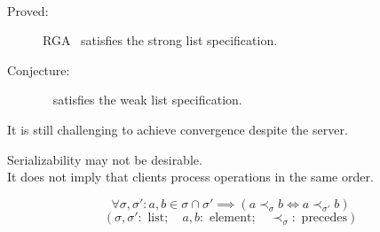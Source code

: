 \begin{frame}{}
  \begin{center}
    ~ \\[6pt]
  \end{center}


  \pause
  \vspace{0.50cm}
  \begin{center}
    \begin{description}
      \item[Proved:] RGA~ satisfies the strong list specification.
      \item[Conjecture:] ~ satisfies the weak list specification.
    \end{description}
  \end{center}
\end{frame}

\begin{frame}{}
  \centerline{It is still challenging to achieve convergence despite the server.}
  

  \begin{center}
    Serializability may not be desirable. \\[6pt]
    It does not imply that clients process operations in the same order.
  \end{center}
\end{frame}

\begin{frame}{}
  \[
    \forall \sigma, \sigma': a, b \in \sigma \cap \sigma' \implies (a \prec_{\sigma} b \iff a \prec_{\sigma'} b)
  \]
  \[
    (\sigma, \sigma': \text{ list}; \quad a, b: \text{ element}; \quad \prec_{\sigma}: \text{ precedes})
  \]

  \begin{columns}
      \vspace{-0.60cm}
      \vspace{-0.60cm}
  \end{columns}
\end{frame}


